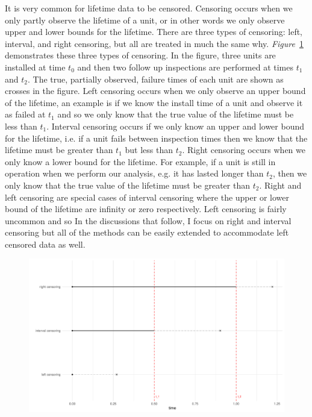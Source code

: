 It is very common for lifetime data to be censored. Censoring occurs when we only partly observe the lifetime of a unit, or in other words we only observe upper and lower bounds for the lifetime. There are three types of censoring: left, interval, and right censoring, but all are treated in much the same why. \textit{Figure}~\ref{fig:cense_examp} demonstrates these three types of censoring. In the figure, three units are installed at time $t_0$ and then two follow up inspections are performed at times $t_1$ and $t_2$. The true, partially observed, failure times of each unit are shown as crosses in the figure. Left censoring occurs when we only observe an upper bound of the lifetime, an example is if we know the install time of a unit and observe it as failed at $t_1$ and so we only know that the true value of the lifetime must be less than $t_1$. Interval censoring occurs if we only know an upper and lower bound for the lifetime, i.e. if a unit fails between inspection times then we know that the lifetime must be greater than $t_1$ but less than $t_2$. Right censoring occurs when we only know a lower bound for the lifetime. For example, if a unit is still in operation when we perform our analysis, e.g. it has lasted longer than $t_2$, then we only know that the true value of the lifetime must be greater than $t_2$. Right and left censoring are special cases of interval censoring where the upper or lower bound of the lifetime are infinity or zero respectively. Left censoring is fairly uncommon and so In the discussions that follow, I focus on right and interval censoring but all of the methods can be easily extended to accommodate left censored data as well.

\begin{figure}[h]
    \centering
    \includegraphics[width=1\textwidth]{./figures/censoring_example.pdf}
    \caption{}
    \label{fig:cense_examp}
\end{figure}

